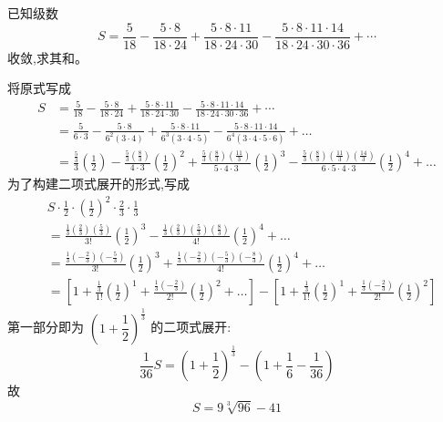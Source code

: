 \begin{questions}
    \question 已知级数
    \[
    S=\frac{5}{18}-\frac{5\cdot8}{18\cdot24}
    +\frac{5\cdot8\cdot11}{18\cdot24\cdot30}
    -\frac{5\cdot8\cdot11\cdot14}{18\cdot24\cdot30\cdot36}
    +\cdots
    \]
    收敛,求其和。
    \begin{solution}
        将原式写成
        \begin{align*}
        S &=\frac{5}{18}-\frac{5\cdot8}{18\cdot24}
        +\frac{5\cdot8\cdot11}{18\cdot24\cdot30}
        -\frac{5\cdot8\cdot11\cdot14}{18\cdot24\cdot30\cdot36}
        +\cdots \\
        &= \frac{5}{6 \cdot 3} - \frac{5 \cdot 8}{6^2(3 \cdot 4)} + \frac{5 \cdot 8 \cdot 11}{6^3(3 \cdot 4 \cdot 5)} - \frac{5 \cdot 8 \cdot 11 \cdot 14}{6^4(3 \cdot 4 \cdot 5 \cdot 6)} + \dots \\
        &= \frac{\frac{5}{3}}{3}\left(\frac{1}{2}\right) - \frac{\frac{5}{3}\left(\frac{8}{3}\right)}{4 \cdot 3}\left(\frac{1}{2}\right)^2 + \frac{\frac{5}{3}\left(\frac{8}{3}\right)\left(\frac{11}{3}\right)}{5 \cdot 4 \cdot 3}\left(\frac{1}{2}\right)^3 - \frac{\frac{5}{3}\left(\frac{8}{3}\right)\left(\frac{11}{3}\right)\left(\frac{14}{3}\right)}{6 \cdot 5 \cdot 4 \cdot 3}\left(\frac{1}{2}\right)^4 + \dots
        \end{align*}
        为了构建二项式展开的形式,写成
        \begin{align*}
        &S \cdot \frac{1}{2} \cdot \left(\frac{1}{2}\right)^2 \cdot \frac{2}{3} \cdot \frac{1}{3} \\
        &= \frac{\frac{1}{3}\left(\frac{2}{3}\right)\left(\frac{5}{3}\right)}{3!}\left(\frac{1}{2}\right)^3 - \frac{\frac{1}{3}\left(\frac{2}{3}\right)\left(\frac{5}{3}\right)\left(\frac{8}{3}\right)}{4!}\left(\frac{1}{2}\right)^4 + \dots \\
        &= \frac{\frac{1}{3}\left(-\frac{2}{3}\right)\left(-\frac{5}{3}\right)}{3!}\left(\frac{1}{2}\right)^3 + \frac{\frac{1}{3}\left(-\frac{2}{3}\right)\left(-\frac{5}{3}\right)\left(-\frac{8}{3}\right)}{4!}\left(\frac{1}{2}\right)^4 + \dots \\
        &= \left[ 1 + \frac{\frac{1}{3}}{1!}\left(\frac{1}{2}\right)^1 + \frac{\frac{1}{3}\left(-\frac{2}{3}\right)}{2!}\left(\frac{1}{2}\right)^2 + \dots \right] - \left[ 1 + \frac{\frac{1}{3}}{1!}\left(\frac{1}{2}\right)^1 + \frac{\frac{1}{3}\left(-\frac{2}{3}\right)}{2!}\left(\frac{1}{2}\right)^2 \right]
        \end{align*}
        第一部分即为 $\left(1 + \dfrac{1}{2}\right)^{\frac{1}{3}}$ 的二项式展开:
        \[
        \frac{1}{36}S = \left(1 + \frac{1}{2}\right)^{\frac{1}{3}} - \left(1 + \frac{1}{6} - \frac{1}{36}\right) 
        \]
        故
        \[
        S = 9\sqrt[3]{96} - 41
        \]
    \end{solution}


\end{questions}
